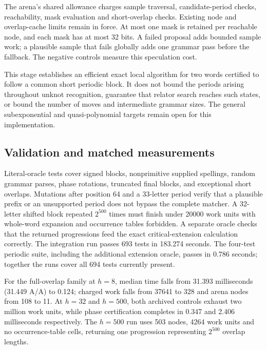 The arena's shared allowance charges sample traversal, candidate-period
checks, reachability, mask evaluation and short-overlap checks. Existing
node and overlap-cache limits remain in force. At most one mask is retained
per reachable node, and each mask has at most 32 bits. A failed proposal
adds bounded sample work; a plausible sample that fails globally adds one
grammar pass before the fallback. The negative controls measure this
speculation cost.

This stage establishes an efficient exact local algorithm for two words
certified to follow a common short periodic block. It does not bound the
periods arising throughout unknot recognition, guarantee that relator search
reaches such states, or bound the number of moves and intermediate grammar
sizes. The general subexponential and quasi-polynomial targets remain open
for this implementation.

\subsection{Validation and matched measurements}

Literal-oracle tests cover signed blocks, nonprimitive supplied spellings,
random grammar parses, phase rotations, truncated final blocks, and
exceptional short overlaps. Mutations after position 64 and a 33-letter
period verify that a plausible prefix or an unsupported period does not
bypass the complete matcher. A 32-letter shifted block repeated $2^{500}$
times must finish under 20000 work units with whole-word expansion and occurrence
tables forbidden. A separate oracle checks that the returned progressions
feed the exact critical-extension calculation correctly.
The integration run passes 693 tests in 183.274 seconds. The four-test
periodic suite, including the additional extension oracle, passes in
0.786 seconds; together the runs cover all 694 tests currently present.





For the full-overlap family at $h=8$, median time falls from 31.393
milliseconds (31.449 A/A) to 0.124; charged work falls from 37641 to
328 and arena nodes from 108 to 11. At $h=32$ and $h=500$, both archived
controls exhaust two million work units, while phase certification completes
in 0.347 and 2.406 milliseconds respectively. The $h=500$ run uses 503
nodes, 4264 work units and no occurrence-table cells, returning one
progression representing $2^{500}$ overlap lengths.

